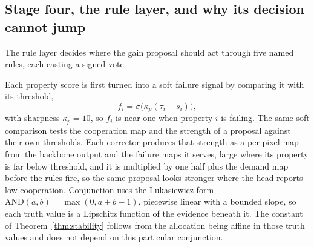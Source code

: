\subsection{Stage four, the rule layer, and why its decision cannot jump}
\label{sec:negotiator}
The rule layer decides where the gain proposal should act through five named rules, each casting a
signed vote.

Each property score is first turned into a soft failure signal by comparing it with its threshold,
\begin{equation}
f_i = \sigma\big(\kappa_p (\tau_i - s_i)\big) ,
\label{eq:soft_failure}
\end{equation}
with sharpness $\kappa_p = 10$, so $f_i$ is near one when property $i$ is failing. The same soft comparison tests the cooperation map
and the strength of a proposal against their own thresholds. Each corrector produces that strength as
a per-pixel map from the backbone output and the failure maps it serves, large where its property is
far below threshold, and it is multiplied by one half plus the demand map before the rules fire, so
the same proposal looks stronger where the head reports low cooperation. Conjunction uses the
Lukasiewicz form $\mathrm{AND}(a,b) = \max(0, a + b - 1)$, piecewise linear with a bounded slope, so
each truth value is a Lipschitz function of the evidence beneath it. The constant of
Theorem~\ref{thm:stability} follows from the allocation being affine in those truth values and does
not depend on this particular conjunction.

